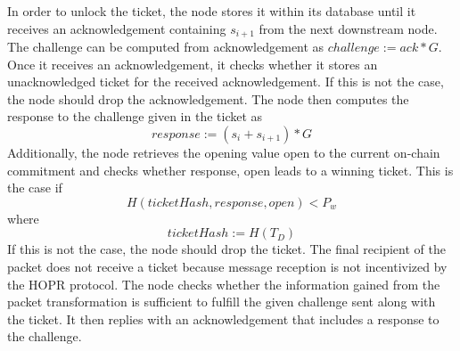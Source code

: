 In order to unlock the ticket, the node stores it within its database until it receives an acknowledgement containing $s_{i+1}$ from the next downstream node. 
The challenge can be computed from acknowledgement as $challenge:=ack*G$.
\newline Once it receives an acknowledgement, it checks whether it stores an unacknowledged ticket for the received acknowledgement. 
If this is not the case, the node should drop the acknowledgement.  
\newline The node then computes the response to the challenge given in the ticket as $$response:=(s_i+s_{i+1})*G$$
Additionally, the node retrieves the opening value open to the current on-chain commitment and checks whether response, open leads to a winning ticket. 
This is the case if $$H( ticketHash, response, open ) <P_w$$ where $$ticketHash:=H(T_D)$$
If this is not the case, the node should drop the ticket. 
The final recipient of the packet does not receive a ticket because message reception is not incentivized by the HOPR protocol.
\newline The node checks whether the information gained from the packet transformation is sufficient to fulfill the given challenge sent along with the ticket. It then replies with an acknowledgement that includes a response to the challenge.







